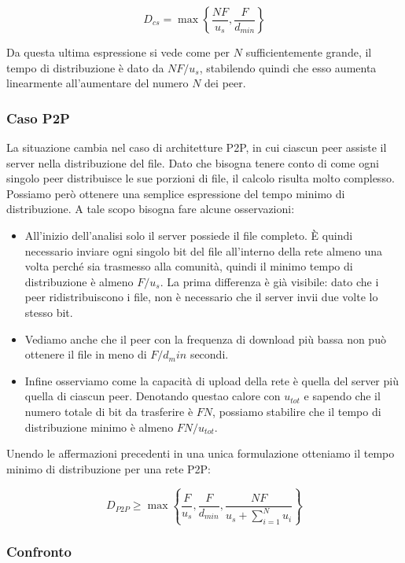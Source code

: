 \[D_{cs} = \max \left\lbrace \frac{NF}{u_s}, \frac{F}{d_{min}} \right\rbrace\]

Da questa ultima espressione si vede come per $N$ sufficientemente
grande, il tempo di distribuzione è dato da $NF/u_s$, stabilendo quindi
che esso aumenta linearmente all'aumentare del numero $N$ dei peer.

\subsubsection{Caso P2P}\label{caso-p2p}

La situazione cambia nel caso di architetture P2P, in cui ciascun peer
assiste il server nella distribuzione del file. Dato che bisogna tenere
conto di come ogni singolo peer distribuisce le sue porzioni di file, il
calcolo risulta molto complesso. Possiamo però ottenere una semplice
espressione del tempo minimo di distribuzione. A tale scopo bisogna fare
alcune osservazioni:

\begin{itemize}
\item
  All'inizio dell'analisi solo il server possiede il file completo. È
  quindi necessario inviare ogni singolo bit del file all'interno della
  rete almeno una volta perché sia trasmesso alla comunità, quindi il
  minimo tempo di distribuzione è almeno $F/u_s$. La prima differenza è
  già visibile: dato che i peer ridistribuiscono i file, non è
  necessario che il server invii due volte lo stesso bit.
\item
  Vediamo anche che il peer con la frequenza di download più bassa non
  può ottenere il file in meno di $F/d_min$ secondi.
\item
  Infine osserviamo come la capacità di upload della rete è quella del
  server più quella di ciascun peer. Denotando questao calore con
  $u_{tot}$ e sapendo che il numero totale di bit da trasferire è $FN$,
  possiamo stabilire che il tempo di distribuzione minimo è almeno
  $FN/u_{tot}$.
\end{itemize}

Unendo le affermazioni precedenti in una unica formulazione otteniamo il
tempo minimo di distribuzione per una rete P2P:

\[ D_{P2P} \geq \max \left\lbrace \frac{F}{u_s}, \frac{F}{d_{min}}, \frac{NF}{u_s + \sum_{i = 1}^N u_i} \right\rbrace \]

\subsubsection{Confronto}\label{confronto}

